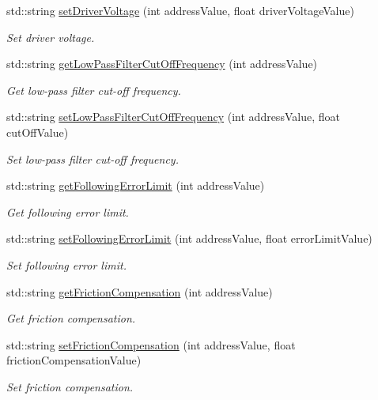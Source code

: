 \begin{DoxyCompactItemize}
std\+::string \hyperlink{namespaceconex_a07def2519839ea99940a654201ff40b9}{set\+Driver\+Voltage} (int address\+Value, float driver\+Voltage\+Value)
\begin{DoxyCompactList}\small\item\em Set driver voltage. \end{DoxyCompactList}\item 
std\+::string \hyperlink{namespaceconex_acaa2df03ff5ad416b1ed256995a40966}{get\+Low\+Pass\+Filter\+Cut\+Off\+Frequency} (int address\+Value)
\begin{DoxyCompactList}\small\item\em Get low-\/pass filter cut-\/off frequency. \end{DoxyCompactList}\item 
std\+::string \hyperlink{namespaceconex_a32f3870ece6ee316eff312c20fe069d3}{set\+Low\+Pass\+Filter\+Cut\+Off\+Frequency} (int address\+Value, float cut\+Off\+Value)
\begin{DoxyCompactList}\small\item\em Set low-\/pass filter cut-\/off frequency. \end{DoxyCompactList}\item 
std\+::string \hyperlink{namespaceconex_a05d5f0585af94bb38ccf8037d86768e5}{get\+Following\+Error\+Limit} (int address\+Value)
\begin{DoxyCompactList}\small\item\em Get following error limit. \end{DoxyCompactList}\item 
std\+::string \hyperlink{namespaceconex_aecd28d691655d6fa73f28b2dd5922f8e}{set\+Following\+Error\+Limit} (int address\+Value, float error\+Limit\+Value)
\begin{DoxyCompactList}\small\item\em Set following error limit. \end{DoxyCompactList}\item 
std\+::string \hyperlink{namespaceconex_afaa116b8274daffbd23139bb930596f9}{get\+Friction\+Compensation} (int address\+Value)
\begin{DoxyCompactList}\small\item\em Get friction compensation. \end{DoxyCompactList}\item 
std\+::string \hyperlink{namespaceconex_a45b737635000384b926ab6e2bd829865}{set\+Friction\+Compensation} (int address\+Value, float friction\+Compensation\+Value)
\begin{DoxyCompactList}\small\item\em Set friction compensation. \end{DoxyCompactList}\item 

\end{DoxyCompactItemize}
